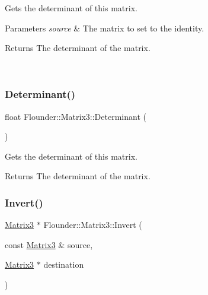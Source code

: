 Gets the determinant of this matrix. 


\begin{DoxyParams}{Parameters}
{\em source} & The matrix to set to the identity. \begin{DoxyReturn}{Returns}
The determinant of the matrix. 
\end{DoxyReturn}
\\
\hline
\end{DoxyParams}
\mbox{\label{class_flounder_1_1_matrix3_a5f689731d7c07d73e4dd95cce63d498f}} 
\subsubsection{\texorpdfstring{Determinant()}{Determinant()}\hspace{0.1cm}{\footnotesize\ttfamily [2/2]}}
{\footnotesize\ttfamily float Flounder\+::\+Matrix3\+::\+Determinant (\begin{DoxyParamCaption}{ }\end{DoxyParamCaption})}



Gets the determinant of this matrix. 

\begin{DoxyReturn}{Returns}
The determinant of the matrix. 
\end{DoxyReturn}
\mbox{\label{class_flounder_1_1_matrix3_a3de5777d7335099b54c892c714efb876}} 
\subsubsection{\texorpdfstring{Invert()}{Invert()}\hspace{0.1cm}{\footnotesize\ttfamily [1/2]}}
{\footnotesize\ttfamily \hyperlink{class_flounder_1_1_matrix3}{Matrix3} $\ast$ Flounder\+::\+Matrix3\+::\+Invert (\begin{DoxyParamCaption}\item[{const \hyperlink{class_flounder_1_1_matrix3}{Matrix3} \&}]{source,  }\item[{\hyperlink{class_flounder_1_1_matrix3}{Matrix3} $\ast$}]{destination }\end{DoxyParamCaption})\hspace{0.3cm}{\ttfamily [static]}}



